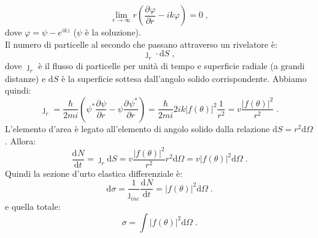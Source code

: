 \documentclass[12pt,a4paper]{report}
\theoremstyle{definition}
\newcommand{\pdev}[3][]{\frac{\partial^{#1} #2}{\partial #3^{#1}}}
\newcommand{\dev}[3][]{\frac{\mathrm{d}^{#1} #2}{\mathrm{d} #3^{#1}}}
\numberwithin{equation}{section}
\newcommand{\diff}[1][]{\mathrm{d}#1}
\begin{document}
\begin{equation}
\lim_{r\to\infty} r\left(\pdev{\varphi}{r}-ik\varphi\right)=0\;,
\end{equation}
dove $\varphi=\psi-e^{ikz}$ ($\psi$ è la soluzione). \\
Il numero di particelle al secondo che passano attraverso un rivelatore è:
\begin{equation}
\jmath_r\cdot \diff{S}\;,
\end{equation}
dove $\jmath_r$ è il flusso di particelle per unità di tempo e superficie radiale (a grandi distanze) e $\diff{S}$ è la superficie sottesa dall'angolo solido corrispondente. Abbiamo quindi:
\begin{equation}
\jmath_r=\frac{\hbar}{2mi}\left(\psi^*\pdev{\psi}{r}-\psi\pdev{\psi^*}{r}\right)=\frac{\hbar}{2mi}2ik|f(\theta)|^2\frac{1}{r^2}=v\frac{|f(\theta)|^2}{r^2}\;.
\end{equation}
L'elemento d'area è legato all'elemento di angolo solido dalla relazione $\diff{S}=r^2\diff{\Omega}$. Allora:
\begin{equation}
\dev{N}{t}=\jmath_r\diff{S}=v\frac{|f(\theta)|^2}{r^2}r^2\diff{\Omega}=v|f(\theta)|^2\diff{\Omega}\;.
\end{equation}
Quindi la sezione d'urto elastica differenziale è:
\begin{equation}
\diff{\sigma}=\frac{1}{\jmath_{inc}}\dev{N}{t}=|f(\theta)|^2\diff{\Omega}\;.
\end{equation}
e quella totale:
\begin{equation}
\sigma=\int |f(\theta)|^2\diff{\Omega}\;.
\end{equation}
\end{document}
